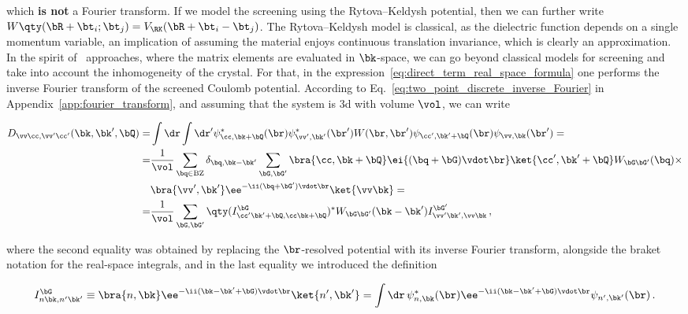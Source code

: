 \noindent which \textbf{is not} a Fourier transform.
If we model the screening using the Rytova--Keldysh potential, then we can further write $W\qty(\bR + \bt_i; \bt_j) = V_\RK (\bR + \bt_i - \bt_j)$.
The Rytova--Keldysh model is classical, as the dielectric function depends on a single momentum variable, an implication of assuming the material enjoys continuous translation invariance, which is clearly an approximation.
In the spirit of \abinit~approaches, where the matrix elements are evaluated in $\bk$-space, we can go beyond classical models for screening and take into account the inhomogeneity of the crystal.
For that, in the expression~\eqref{eq:direct_term_real_space_formula} one performs the inverse Fourier transform of the screened Coulomb potential.
According to Eq.~\eqref{eq:two_point_discrete_inverse_Fourier} in Appendix~\ref{app:fourier_transform}, and assuming that the system is \gls{3d} with volume $\vol$, we can write

\begin{equation}
    \begin{aligned}
        \label{eq:interaction_matrix_element_direct_reciprocal}
        D_{\vv \cc , \vv ' \cc '}(\bk,\bk',\bQ) =& \int \dr \int \dr' \psi^*_{\cc ,\bk+\bQ}(\br) \psi^*_{\vv ',\bk'}(\br') W(\br,\br') \psi_{\cc ',\bk'+\bQ}(\br) \psi_{\vv, \bk}(\br') = \\
        =& \frac{1}{\vol} \sum_{\bq \in \mathrm{BZ}} \delta_{\bq,\bk - \bk'} \sum_{\bG,\bG'} \bra{\cc ,\bk+\bQ} \ei{(\bq + \bG) \vdot \br} \ket{\cc ',\bk'+\bQ} W_{\bG \bG'}(\bq) \times \\
         & \bra{\vv ',\bk'} \ee^{-\ii (\bq + \bG') \vdot \br} \ket{\vv \bk} = \\
        =& \frac{1}{\vol} \sum_{\bG,\bG'} \qty(I^{\bG}_{\cc ' \bk'+\bQ, \cc  \bk+\bQ})^* W_{\bG \bG'}(\bk - \bk') I^{\bG'}_{\vv ' \bk',\vv \bk}\,,
    \end{aligned}
\end{equation}

\noindent where the second equality was obtained by replacing the $\br$-resolved potential with its inverse Fourier transform, alongside the braket notation for the real-space integrals, and in the last equality we introduced the definition

\begin{equation}
\label{eq:plane_wave_matrix_element_definition}
    I^{\bG}_{n \bk, n' \bk'} \equiv \bra{n,\bk} \ee^{-\ii (\bk - \bk' + \bG) \vdot \br} \ket{n',\bk'} = \int \dr\, \psi^*_{n,\bk} (\br) \ee^{-\ii(\bk  - \bk' + \bG) \vdot \br} \psi_{n', \bk'} (\br)\,.
\end{equation}

